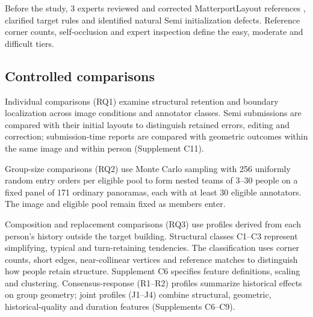 Before the study, 3 experts reviewed and corrected MatterportLayout references \cite{chang2017matterport3d,zou2021manhattan}, clarified target rules and identified natural Semi initialization defects. Reference corner counts, self-occlusion and expert inspection define the easy, moderate and difficult tiers.

\subsection{Controlled comparisons}

Individual comparisons (RQ1) examine structural retention and boundary localization across image conditions and annotator classes. Semi submissions are compared with their initial layouts to distinguish retained errors, editing and correction; submission-time reports are compared with geometric outcomes within the same image and within person (Supplement C11).

Group-size comparisons (RQ2) use Monte Carlo sampling with 256 uniformly random entry orders per eligible pool to form nested teams of 3--30 people on a fixed panel of 171 ordinary panoramas, each with at least 30 eligible annotators. The image and eligible pool remain fixed as members enter.

Composition and replacement comparisons (RQ3) use profiles derived from each person's history outside the target building. Structural classes C1--C3 represent simplifying, typical and turn-retaining tendencies. The classification uses corner counts, short edges, near-collinear vertices and reference matches to distinguish how people retain structure. Supplement C6 specifies feature definitions, scaling and clustering. Consensus-response (R1--R2) profiles summarize historical effects on group geometry; joint profiles (J1--J4) combine structural, geometric, historical-quality and duration features (Supplements C6--C9).

